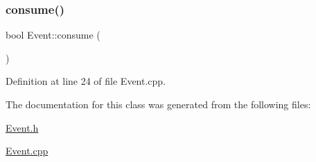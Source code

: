 \subsubsection{\texorpdfstring{consume()}{consume()}}
{\footnotesize\ttfamily bool Event\+::consume (\begin{DoxyParamCaption}{ }\end{DoxyParamCaption})}



Definition at line 24 of file Event.\+cpp.



The documentation for this class was generated from the following files\+:\begin{DoxyCompactItemize}
\item 
\hyperlink{_event_8h}{Event.\+h}\item 
\hyperlink{_event_8cpp}{Event.\+cpp}\end{DoxyCompactItemize}
